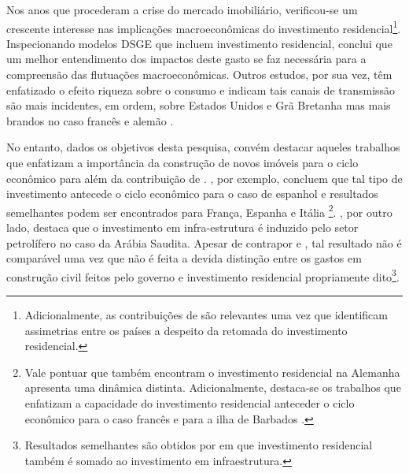 
Nos anos que procederam a crise do mercado imobiliário, verificou-se um crescente interesse nas implicações macroeconômicas do investimento residencial\footnote{Adicionalmente, as contribuições de \textcite{arestis_residential_2015} são relevantes uma vez que identificam assimetrias entre os países a despeito da retomada do investimento residencial.}. Inspecionando modelos DSGE que incluem investimento residencial, \textcite{iacoviello_housing_2010} conclui que um melhor entendimento dos impactos deste gasto se faz necessária para a compreensão das flutuações macroeconômicas. Outros estudos, por sua vez, têm enfatizado o efeito riqueza sobre o consumo e indicam tais canais de transmissão são mais incidentes, em ordem, sobre Estados Unidos e Grã Bretanha mas mais brandos no caso francês e alemão \cites{sastre_assessment_2010}{chauvin_wealth_2010}{bassanetti_effects_2010}{arrondel_housing_2010}. 


No entanto, dados os objetivos desta pesquisa, convém destacar aqueles trabalhos que enfatizam a importância da construção de novos imóveis para o ciclo econômico para além da contribuição de \textcite{leamer_housing_2007}. \textcite{alvarez_does_2010}, por exemplo, concluem que tal tipo de investimento antecede o ciclo econômico para o caso de espanhol e resultados semelhantes podem ser encontrados para França, Espanha  e Itália \cite{ferrara_common_2010}\footnote{
	Vale pontuar que \textcite{ferrara_common_2010} também encontram o investimento residencial na Alemanha apresenta uma dinâmica distinta. Adicionalmente, destaca-se os trabalhos que enfatizam a capacidade do investimento residencial anteceder o ciclo econômico para o caso francês \cite{ferrara_cyclical_2010} e para a ilha de Barbados \cite{jackman_investigating_2010}.}. 
\textcite{alhowaish_causality_2015}, por outro lado, destaca que o investimento em infra-estrutura é induzido pelo setor petrolífero no caso da Arábia Saudita. Apesar de contrapor \textcite{green_follow_1997}  e \textcite{leamer_housing_2007}, tal resultado não é comparável uma vez que não é feita a devida distinção entre os gastos em construção civil feitos pelo governo e investimento residencial propriamente dito\footnote{Resultados semelhantes são obtidos por \textcite{ofori_testing_2003} em que investimento residencial também é somado ao investimento em infraestrutura.}.


